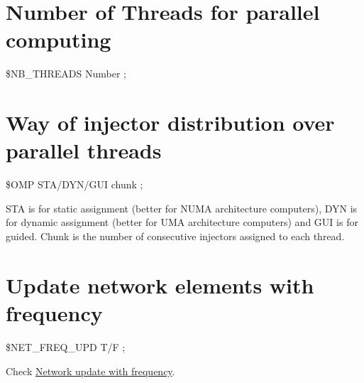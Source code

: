 \section{Number of Threads for parallel computing}

 \$NB\_THREADS Number ;


\section{Way of injector distribution over parallel
	threads}

 \$OMP STA/DYN/GUI chunk ;

STA is for static assignment (better for NUMA architecture computers),
DYN is for dynamic assignment (better for UMA architecture computers)
and GUI is for guided. Chunk is the number of consecutive injectors
assigned to each thread.


\section{Update network elements with frequency}

 \$NET\_FREQ\_UPD T/F ;

Check \href{file:models/freq_upd_vminmax.pdf}{Network update with frequency}.